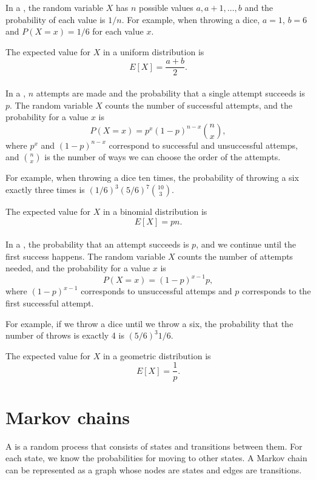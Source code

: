 In a ,
the random variable $X$ has $n$ possible
values $a,a+1,\ldots,b$ and the probability of each value is $1/n$.
For example, when throwing a dice,
$a=1$, $b=6$ and $P(X=x)=1/6$ for each value $x$.

The expected value for $X$ in a uniform distribution is
\[E[X] = \frac{a+b}{2}.\]
~\\
In a , $n$ attempts
are made
and the probability that a single attempt succeeds
is $p$.
The random variable $X$ counts the number of
successful attempts,
and the probability for a value $x$ is
\[P(X=x)=p^x (1-p)^{n-x} {n \choose x},\]
where $p^x$ and $(1-p)^{n-x}$ correspond to
successful and unsuccessful attemps,
and ${n \choose x}$ is the number of ways
we can choose the order of the attempts.

For example, when throwing a dice ten times,
the probability of throwing a six exactly
three times is $(1/6)^3 (5/6)^7 {10 \choose 3}$.

The expected value for $X$ in a binomial distribution is
\[E[X] = pn.\]
~\\
In a ,
the probability that an attempt succeeds is $p$,
and we continue until the first success happens.
The random variable $X$ counts the number
of attempts needed, and the probability for
a value $x$ is
\[P(X=x)=(1-p)^{x-1} p,\]
where $(1-p)^{x-1}$ corresponds to unsuccessful attemps
and $p$ corresponds to the first successful attempt.

For example, if we throw a dice until we throw a six,
the probability that the number of throws
is exactly 4 is $(5/6)^3 1/6$.

The expected value for $X$ in a geometric distribution is
\[E[X]=\frac{1}{p}.\]

\section{Markov chains}


A 
is a random process
that consists of states and transitions between them.
For each state, we know the probabilities
for moving to other states.
A Markov chain can be represented as a graph
whose nodes are states and edges are transitions.

